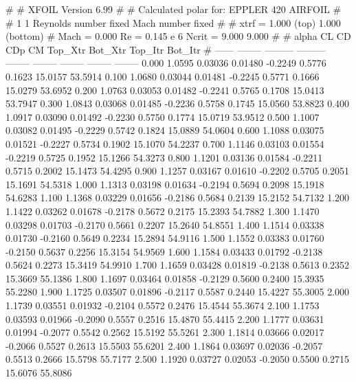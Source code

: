 #  
#       XFOIL         Version 6.99
#  
# Calculated polar for: EPPLER 420 AIRFOIL                              
#  
# 1 1 Reynolds number fixed          Mach number fixed         
#  
# xtrf =   1.000 (top)        1.000 (bottom)  
# Mach =   0.000     Re =     0.145 e 6     Ncrit =   9.000  9.000
#  
#   alpha    CL        CD       CDp       CM     Top_Xtr  Bot_Xtr  Top_Itr  Bot_Itr
#  ------ -------- --------- --------- -------- -------- -------- -------- --------
   0.000   1.0595   0.03036   0.01480  -0.2249   0.5776   0.1623  15.0157  53.5914
   0.100   1.0680   0.03044   0.01481  -0.2245   0.5771   0.1666  15.0279  53.6952
   0.200   1.0763   0.03053   0.01482  -0.2241   0.5765   0.1708  15.0413  53.7947
   0.300   1.0843   0.03068   0.01485  -0.2236   0.5758   0.1745  15.0560  53.8823
   0.400   1.0917   0.03090   0.01492  -0.2230   0.5750   0.1774  15.0719  53.9512
   0.500   1.1007   0.03082   0.01495  -0.2229   0.5742   0.1824  15.0889  54.0604
   0.600   1.1088   0.03075   0.01521  -0.2227   0.5734   0.1902  15.1070  54.2237
   0.700   1.1146   0.03103   0.01554  -0.2219   0.5725   0.1952  15.1266  54.3273
   0.800   1.1201   0.03136   0.01584  -0.2211   0.5715   0.2002  15.1473  54.4295
   0.900   1.1257   0.03167   0.01610  -0.2202   0.5705   0.2051  15.1691  54.5318
   1.000   1.1313   0.03198   0.01634  -0.2194   0.5694   0.2098  15.1918  54.6283
   1.100   1.1368   0.03229   0.01656  -0.2186   0.5684   0.2139  15.2152  54.7132
   1.200   1.1422   0.03262   0.01678  -0.2178   0.5672   0.2175  15.2393  54.7882
   1.300   1.1470   0.03298   0.01703  -0.2170   0.5661   0.2207  15.2640  54.8551
   1.400   1.1514   0.03338   0.01730  -0.2160   0.5649   0.2234  15.2894  54.9116
   1.500   1.1552   0.03383   0.01760  -0.2150   0.5637   0.2256  15.3154  54.9569
   1.600   1.1584   0.03433   0.01792  -0.2138   0.5624   0.2273  15.3419  54.9910
   1.700   1.1659   0.03428   0.01819  -0.2138   0.5613   0.2352  15.3669  55.1386
   1.800   1.1697   0.03464   0.01858  -0.2129   0.5600   0.2400  15.3935  55.2280
   1.900   1.1725   0.03507   0.01896  -0.2117   0.5587   0.2440  15.4227  55.3005
   2.000   1.1739   0.03551   0.01932  -0.2104   0.5572   0.2476  15.4544  55.3674
   2.100   1.1753   0.03593   0.01966  -0.2090   0.5557   0.2516  15.4870  55.4415
   2.200   1.1777   0.03631   0.01994  -0.2077   0.5542   0.2562  15.5192  55.5261
   2.300   1.1814   0.03666   0.02017  -0.2066   0.5527   0.2613  15.5503  55.6201
   2.400   1.1864   0.03697   0.02036  -0.2057   0.5513   0.2666  15.5798  55.7177
   2.500   1.1920   0.03727   0.02053  -0.2050   0.5500   0.2715  15.6076  55.8086
